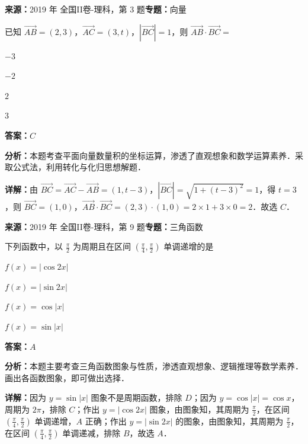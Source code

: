 \begin{question}[points=5]
\textbf{来源：}2019 年 全国II卷-理科，第 3 题\quad \textbf{专题：}向量\par
已知 $\overrightarrow{AB}=(2,3)$，$\overrightarrow{AC}=(3,t)$，$|\overrightarrow{BC}|=1$，则 $\overrightarrow{AB}\cdot\overrightarrow{BC}=$
\begin{choices}
  \item $-3$
  \item $-2$
  \item $2$
  \item $3$
\end{choices}
\begin{solution}
\textbf{答案：}$C$

\textbf{分析：}本题考查平面向量数量积的坐标运算，渗透了直观想象和数学运算素养．采取公式法，利用转化与化归思想解题．

\textbf{详解：}由 $\overrightarrow{BC}=\overrightarrow{AC}-\overrightarrow{AB}=(1,t-3)$，$|\overrightarrow{BC}|=\sqrt{1+(t-3)^2}=1$，得 $t=3$，则 $\overrightarrow{BC}=(1,0)$，$\overrightarrow{AB}\cdot\overrightarrow{BC}=(2,3)\cdot(1,0)=2\times1+3\times0=2$．故选 $C$．
\end{solution}
\end{question}

\begin{question}[points=5]
\textbf{来源：}2019 年 全国II卷-理科，第 9 题\quad \textbf{专题：}三角函数\par
下列函数中，以 $\frac{\pi}{2}$ 为周期且在区间 $(\frac{\pi}{4},\frac{\pi}{2})$ 单调递增的是
\begin{choices}
  \item $f(x)=|\cos 2x|$
  \item $f(x)=|\sin 2x|$
  \item $f(x)=\cos|x|$
  \item $f(x)=\sin|x|$
\end{choices}
\begin{solution}
\textbf{答案：}$A$

\textbf{分析：}本题主要考查三角函数图象与性质，渗透直观想象、逻辑推理等数学素养．画出各函数图象，即可做出选择．

\textbf{详解：}因为 $y=\sin|x|$ 图象不是周期函数，排除 $D$；因为 $y=\cos|x|=\cos x$，周期为 $2\pi$，排除 $C$；作出 $y=|\cos 2x|$ 图象，由图象知，其周期为 $\frac{\pi}{2}$，在区间 $(\frac{\pi}{4},\frac{\pi}{2})$ 单调递增，$A$ 正确；作出 $y=|\sin 2x|$ 的图象，由图象知，其周期为 $\frac{\pi}{2}$，在区间 $(\frac{\pi}{4},\frac{\pi}{2})$ 单调递减，排除 $B$，故选 $A$．
\end{solution}
\end{question}

